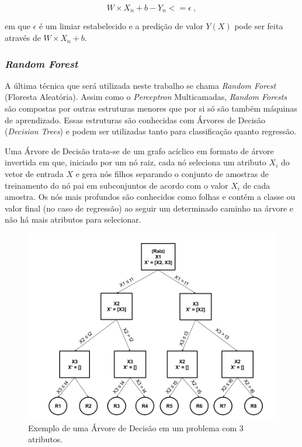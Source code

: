 \documentclass[12pt]{article}
\begin{document}
            \begin{equation} 
            \label{eq:svrRestriction2}
            W \times X_n + b - Y_n <= \epsilon ~,
            \end{equation}
            
            \noindent em que $\epsilon$ é um limiar estabelecido e a predição de valor $Y(X)$ pode ser feita através de $W \times X_n + b$.
            
            \subsubsection{\textit{Random Forest}}
            \label{sec:randomForest}

            A última técnica que será utilizada neste trabalho se chama \textit{Random Forest} (Floresta Aleatória). Assim como o \textit{Perceptron} Multicamadas, \textit{Random Forests} são compostas por outras estruturas menores que por si só são também máquinas de aprendizado. Essas estruturas são conhecidas com Árvores de Decisão (\textit{Decision Trees}) e podem ser utilizadas tanto para classificação quanto regressão.
            
            Uma Árvore de Decisão trata-se de um grafo acíclico em formato de árvore invertida em que, iniciado por um nó raiz, cada nó seleciona um atributo $X_i$ do vetor de entrada $X$ e gera nós filhos separando o conjunto de amostras de treinamento do nó pai em subconjuntos de acordo com o valor $X_i$ de cada amostra. Os nós mais profundos são conhecidos como folhas e contém a classe ou valor final (no caso de regressão) ao seguir um determinado caminho na árvore e não há mais atributos para selecionar.
            
            \begin{figure}[H]
            \centering
            \includegraphics[width=16cm]{images/arvoreDecisao.png}\par
            \caption{Exemplo de uma Árvore de Decisão em um problema com 3 atributos.}
            \label{fig:decisionTree}
            \end{figure}
            
\end{document}
